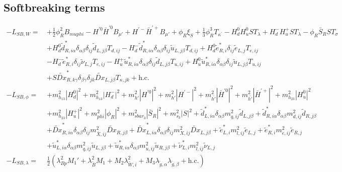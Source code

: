 \subsection{Softbreaking terms} 
\begin{align} 
- L_{SB,W} = \, & +\frac{1}{2} \phi_{R}^{2} B_{muphi} - H^{'0} \bar{H}^{'0} B_{\mu'} +H^{'-} \bar{H}^{'+} B_{\mu'} +\phi_R \xi_S +\frac{1}{3} \phi_{R}^{3} T_{\kappa^\prime} - H_d^0 H_u^0 S T_{\lambda} +H_d^- H_u^+ S T_{\lambda} - \phi_R \bar{S}_R S T_{\sigma} \nonumber \\ 
 &+H_d^0 \tilde{d}^*_{R,{i \alpha}} \delta_{\alpha \beta} \delta_{i j} \tilde{d}_{L,{j \beta}} T_{d,{i j}} - H_d^- \tilde{d}^*_{R,{i \alpha}} \delta_{\alpha \beta} \delta_{i j} \tilde{u}_{L,{j \beta}} T_{d,{i j}} +H_d^0 \tilde{e}^*_{R,{i}} \delta_{i j} \tilde{e}_{L,{j}} T_{e,{i j}} \nonumber \\ 
 &- H_d^- \tilde{e}^*_{R,{i}} \delta_{i j} \tilde{\nu}_{L,{j}} T_{e,{i j}} - H_u^+ \tilde{u}^*_{R,{i \alpha}} \delta_{\alpha \beta} \delta_{i j} \tilde{d}_{L,{j \beta}} T_{u,{i j}} +H_u^0 \tilde{u}^*_{R,{i \alpha}} \delta_{\alpha \beta} \delta_{i j} \tilde{u}_{L,{j \beta}} T_{u,{i j}} \nonumber \\ 
 &+S \tilde{Dx}^*_{R,{k \gamma}} \delta_{\beta \gamma} \delta_{j k} \tilde{Dx}_{L,{j \beta}} T_{\kappa,{j k}} + \mbox{h.c.} \\ 
- L_{SB,\phi} = \, & +m_{h_{13}}^2 |H_d^0|^2 +m_{h_{13}}^2 |H_d^-|^2 +m_{h'}^2 |H^{'0}|^2 +m_{h'}^2 |H^{'-}|^2 +m_{\bar{h'}}^2 |\bar{H}^{'0}|^2 +m_{\bar{h'}}^2 |\bar{H}^{'+}|^2 +m_{h_{23}}^2 |H_u^0|^2 \nonumber \\ 
 &+m_{h_{23}}^2 |H_u^+|^2 +m_{phi}^2 |\phi_R|^2 +m_{sbar_3}^2 |\bar{S}_R|^2 +m_{s_3}^2 |S|^2 +\tilde{d}^*_{L,{i \alpha}} \delta_{\alpha \beta} m_{q,{i j}}^{2} \tilde{d}_{L,{j \beta}} +\tilde{d}^*_{R,{i \alpha}} \delta_{\alpha \beta} m_{d,{i j}}^{2} \tilde{d}_{R,{j \beta}} \nonumber \\ 
 &+\tilde{Dx}^*_{R,{i \alpha}} \delta_{\alpha \beta} \delta_{i j} m_{\bar{X},{i j}}^{2} \tilde{Dx}_{R,{j \beta}} +\tilde{Dx}^*_{L,{i \alpha}} \delta_{\alpha \beta} \delta_{i j} m_{X,{i j}}^{2} \tilde{Dx}_{L,{j \beta}} +\tilde{e}^*_{L,{i}} m_{l,{i j}}^{2} \tilde{e}_{L,{j}} +\tilde{e}^*_{R,{i}} m_{e,{i j}}^{2} \tilde{e}_{R,{j}} \nonumber \\ 
 &+\tilde{u}^*_{L,{i \alpha}} \delta_{\alpha \beta} m_{q,{i j}}^{2} \tilde{u}_{L,{j \beta}} +\tilde{u}^*_{R,{i \alpha}} \delta_{\alpha \beta} m_{u,{i j}}^{2} \tilde{u}_{R,{j \beta}} +\tilde{\nu}^*_{L,{i}} m_{l,{i j}}^{2} \tilde{\nu}_{L,{j}} \\ 
- L_{SB,\lambda} = \, & \frac{1}{2}\left(\lambda_{Bp}^{2} M_1'  + \lambda_{\tilde{B}}^{2} M_1  + M_2 \lambda_{{\tilde{W}},{i}}^{2}  + M_3 \lambda_{{\tilde{g}},{\alpha}} \lambda_{{\tilde{g}},{\beta}} + \mbox{h.c.} \right) 
\end{align} 
